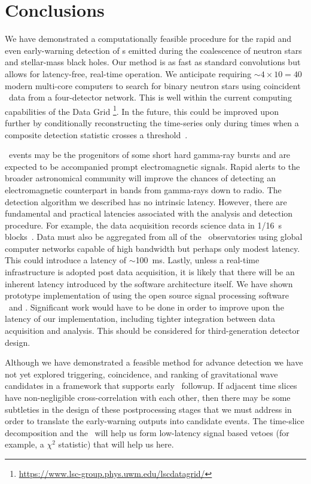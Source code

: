\section{Conclusions}
\label{sec:conclusions}

We have demonstrated a computationally feasible procedure for the rapid and
even early-warning detection of \GW{}s emitted during the coalescence
of neutron stars and stellar-mass black holes. Our method is as fast as
standard \fft{} convolutions but allows for latency-free, real-time
operation.  We anticipate requiring $\sim 4 \times 10 = 40$ modern multi-core computers to
search for binary neutron stars using coincident \GW\ data from a four-detector network.
This is well within the current computing capabilities of the \LIGO{} Data Grid%
\footnote{\url{https://www.lsc-group.phys.uwm.edu/lscdatagrid/}}. In the future, this
could be improved upon further by conditionally reconstructing the \SNR{} time-series
only during times when a composite detection statistic crosses a
threshold~\citep{svd-compdetstat}.

\CBC\ events may be the progenitors of some short hard gamma-ray bursts and are
expected to be accompanied prompt electromagnetic signals.  Rapid
alerts to the broader astronomical community will improve the chances of
detecting an electromagnetic counterpart in bands from gamma-rays down to
radio.  The detection algorithm we described has no intrinsic latency.  However, there are
fundamental and practical latencies associated with the analysis and detection
procedure. For example, the \LIGO{} data acquisition records science data in 1/16~s
blocks~\citep{Bork2001}. Data must also be aggregated from all of the \GW\
observatories using global computer networks capable of high bandwidth but perhaps only
modest latency.  This could introduce a latency of $\sim$100~ms.  Lastly, unless a
real-time infrastructure is adopted post data acquisition, it is likely that there will be 
an inherent latency introduced by the software architecture itself.  We have shown 
prototype implementation of \lloid{} using the open source signal processing software
\gstreamer\ and \gstlal. Significant work would have to be done in order to
improve upon the latency of our implementation, including tighter integration between
data acquisition and analysis. This should be considered for third-generation detector
design.

Although we have demonstrated a feasible method for advance detection we have
not yet explored triggering, coincidence, and ranking of gravitational wave
candidates in a framework that supports early \EM\ followup.  If adjacent time slices
have non-negligible cross-correlation with each other, then there may be some
subtleties in the design of these postprocessing stages that we must address in order
to translate the early-warning outputs into candidate events.  The time-slice
decomposition and the \SVD\ will help us form low-latency signal based vetoes
(for example, a $\chi^2$ statistic) that will help us here.

